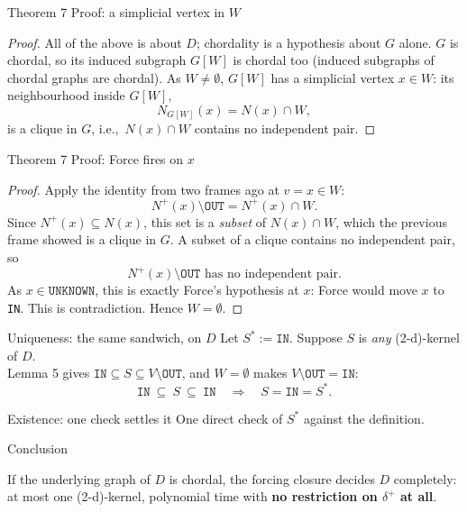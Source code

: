 \documentclass[11pt]{beamer}
\begin{document}
\begin{frame}{Theorem 7 Proof: a simplicial vertex in $W$}
  \begin{proof}
    All of the above is about $D$; chordality is a hypothesis about $G$
    alone. $G$ is chordal, so its induced subgraph $G[W]$ is chordal too
    (induced subgraphs of chordal graphs are chordal). As $W\neq\emptyset$,
    $G[W]$ has a simplicial vertex $x\in W$: its neighbourhood inside
    $G[W]$,
    \[
      N_{G[W]}(x) = N(x)\cap W,
    \]
    is a clique in $G$, i.e.,\ $N(x)\cap W$ contains no independent pair.
  \end{proof}
\end{frame}

\begin{frame}{Theorem 7 Proof: Force fires on $x$}
  \begin{proof}
    Apply the identity from two frames ago at $v = x\in W$:
    \[
      N^+(x)\setminus\texttt{OUT} = N^+(x)\cap W.
    \]
    Since $N^+(x)\subseteq N(x)$, this set is a \emph{subset} of $N(x)\cap
      W$, which the previous frame showed is a clique in $G$. A subset of a
    clique contains no independent pair, so
    \[
      \boxed{N^+(x)\setminus\texttt{OUT}\text{ has no independent pair.}}
    \]
    As $x\in\texttt{UNKNOWN}$, this is exactly Force's hypothesis at $x$:
    Force would move $x$ to \texttt{IN}. This is contradiction. Hence $W=\emptyset$. \qedhere
  \end{proof}
\end{frame}

\begin{frame}{Uniqueness: the same sandwich, on $D$}
  Let $S^\ast:=\texttt{IN}$. Suppose $S$ is \emph{any} (2-d)-kernel of $D$. \\
  Lemma 5 gives $\texttt{IN}\subseteq S\subseteq V\setminus\texttt{OUT}$,
  and $W=\emptyset$ makes $V\setminus\texttt{OUT}=\texttt{IN}$:
  \[
    \boxed{\texttt{IN}\ \subseteq\ S\ \subseteq\ \texttt{IN}
      \quad\Longrightarrow\quad S=\texttt{IN}=S^\ast.}
  \]
\end{frame}

\begin{frame}{Existence: one check settles it}
  One direct check of $S^\ast$ against the definition.
\end{frame}

\begin{frame}{Conclusion}
  \addtocounter{theorem}{-1}
  \begin{theorem}
    If the underlying graph of $D$ is chordal, the forcing closure decides $D$
    completely: at most one (2-d)-kernel, polynomial time with \textbf{no
      restriction on $\delta^+$ at all}.
  \end{theorem}
\end{frame}
\end{document}
